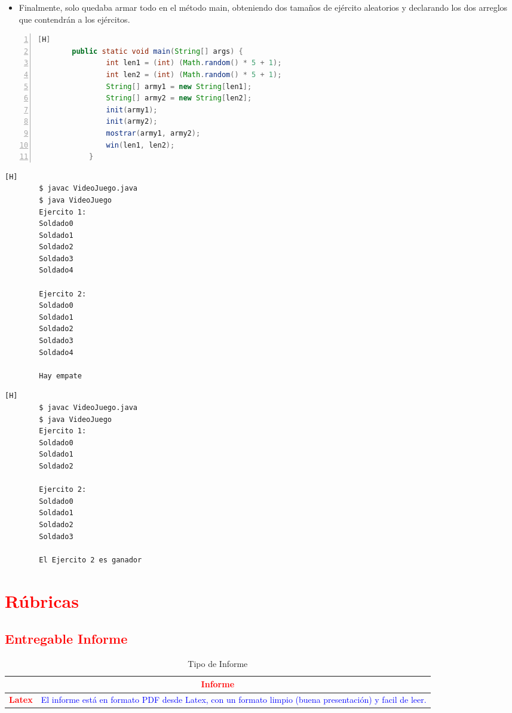 \documentclass{article}
\begin{document}
	\begin{itemize}
		\item Finalmente, solo quedaba armar todo en el método main, obteniendo dos tamaños de ejército aleatorios y declarando los dos arreglos que contendrán a los ejércitos.
	\end{itemize}
	\begin{lstlisting}[language=java,caption={Código final armado}, numbers=left][H]
		public static void main(String[] args) {
        		int len1 = (int) (Math.random() * 5 + 1);
        		int len2 = (int) (Math.random() * 5 + 1);
        		String[] army1 = new String[len1];
        		String[] army2 = new String[len2];
        		init(army1);
        		init(army2);
        		mostrar(army1, army2);
        		win(len1, len2);
    		}
	\end{lstlisting}
	\begin{lstlisting}[language=bash,caption={Ejecutando el Video juego}][H]
		$ javac VideoJuego.java
		$ java VideoJuego
		Ejercito 1:
		Soldado0
		Soldado1
		Soldado2
		Soldado3
		Soldado4

		Ejercito 2:
		Soldado0
		Soldado1
		Soldado2
		Soldado3
		Soldado4

		Hay empate
	\end{lstlisting}
	\begin{lstlisting}[language=bash,caption={Probando de nuevo, debería ser aleatorio}][H]
		$ javac VideoJuego.java
		$ java VideoJuego
		Ejercito 1:
		Soldado0
		Soldado1
		Soldado2

		Ejercito 2:
		Soldado0
		Soldado1
		Soldado2
		Soldado3

		El Ejercito 2 es ganador
	\end{lstlisting}
	\section{\textcolor{red}{Rúbricas}}
	
	\subsection{\textcolor{red}{Entregable Informe}}
	\begin{table}[H]
		\caption{Tipo de Informe}
		\setlength{\tabcolsep}{0.5em} %
		{\renewcommand{\arraystretch}{1.5}%
		\begin{tabular}{|p{3cm}|p{12cm}|}
			\hline
			\multicolumn{2}{|c|}{\textbf{\textcolor{red}{Informe}}}  \\
			\hline 
			\textbf{\textcolor{red}{Latex}} & \textcolor{blue}{El informe está en formato PDF desde Latex,  con un formato limpio (buena presentación) y facil de leer.}   \\ 
			\hline 
			
			
		\end{tabular}
	}
	\end{table}
	
\end{document}
